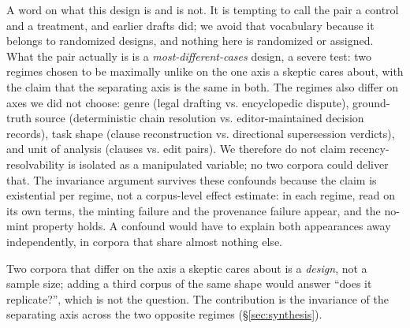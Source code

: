 \documentclass[11pt]{article}
\begin{document}
A word on what this design is and is not. It is tempting to call the pair a control and a
treatment, and earlier drafts did; we avoid that vocabulary because it belongs to randomized
designs, and nothing here is randomized or assigned. What the pair actually is is a
\emph{most-different-cases} design, a severe test: two regimes chosen to be maximally unlike on
the one axis a skeptic cares about, with the claim that the separating axis is the same in
both. The regimes also differ on axes we did not choose: genre (legal drafting vs.
encyclopedic dispute), ground-truth source (deterministic chain resolution vs.
editor-maintained decision records), task shape (clause reconstruction vs. directional
supersession verdicts), and unit of analysis (clauses vs. edit pairs). We therefore do not
claim recency-resolvability is isolated as a manipulated variable; no two corpora could
deliver that. The invariance argument survives these confounds because the claim is
existential per regime, not a corpus-level effect estimate: in each regime, read on its own
terms, the minting failure and the provenance failure appear, and the no-mint property
holds. A confound would have to explain both appearances away independently, in corpora
that share almost nothing else.

Two corpora that differ on the axis a skeptic cares about is a \emph{design}, not a sample size;
adding a third corpus of the same shape would answer ``does it replicate?'', which is not the
question. The contribution is the invariance of the separating axis across the two
opposite regimes (\S\ref{sec:synthesis}).
\end{document}
